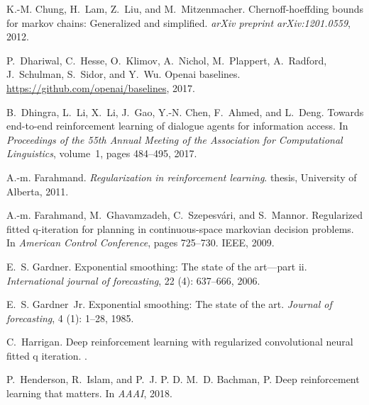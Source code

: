 \documentclass{article}
\begin{document}
\begin{thebibliography}{36}
K.-M. Chung, H.~Lam, Z.~Liu, and M.~Mitzenmacher.
\newblock Chernoff-hoeffding bounds for markov chains: Generalized and
  simplified.
\newblock \emph{arXiv preprint arXiv:1201.0559}, 2012.

P.~Dhariwal, C.~Hesse, O.~Klimov, A.~Nichol, M.~Plappert, A.~Radford,
  J.~Schulman, S.~Sidor, and Y.~Wu.
\newblock Openai baselines.
\newblock \url{https://github.com/openai/baselines}, 2017.

B.~Dhingra, L.~Li, X.~Li, J.~Gao, Y.-N. Chen, F.~Ahmed, and L.~Deng.
\newblock Towards end-to-end reinforcement learning of dialogue agents for
  information access.
\newblock In \emph{Proceedings of the 55th Annual Meeting of the Association
  for Computational Linguistics}, volume~1, pages 484--495, 2017.

A.-m. Farahmand.
\newblock \emph{Regularization in reinforcement learning}.
 thesis, University of Alberta, 2011.

A.-m. Farahmand, M.~Ghavamzadeh, C.~Szepesv{\'a}ri, and S.~Mannor.
\newblock Regularized fitted q-iteration for planning in continuous-space
  markovian decision problems.
\newblock In \emph{American Control Conference}, pages 725--730. IEEE, 2009.

E.~S. Gardner.
\newblock Exponential smoothing: The state of the art—part ii.
\newblock \emph{International journal of forecasting}, 22
  (4): 637--666, 2006.

E.~S. Gardner~Jr.
\newblock Exponential smoothing: The state of the art.
\newblock \emph{Journal of forecasting}, 4 (1): 1--28, 1985.

C.~Harrigan.
\newblock Deep reinforcement learning with regularized convolutional neural
  fitted q iteration.
.

P.~Henderson, R.~Islam, and P.~J. P. D. M.~D. Bachman, P.
\newblock Deep reinforcement learning that matters.
\newblock In \emph{AAAI}, 2018.


\end{thebibliography}
\end{document}
